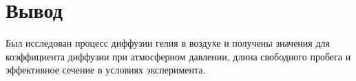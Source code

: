 \section{Вывод}
Был исследован процесс диффузии гелия в воздухе и получены значения для коэффициента диффузии
при атмосферном давлении, длина свободного пробега и эффективное сечение в условиях эксперимента.
